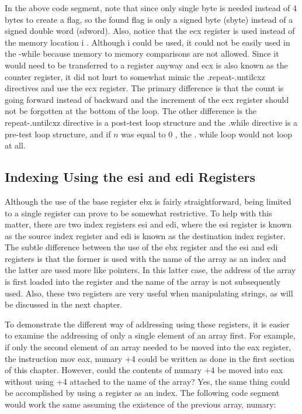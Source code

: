 \documentclass[10pt]{article}
\begin{document}
In the above code segment, note that since only single byte is needed instead of 4 bytes to create a flag, so the found flag is only a signed byte (sbyte) instead of a signed double word (sdword). Also, notice that the ecx register is used instead of the memory location i . Although i could be used, it could not be easily used in the -while because memory to memory comparisons are not allowed. Since it would need to be transferred to a register anyway and ecx is also known as the counter register, it did not hurt to somewhat mimic the .repeat-.untilcxz directives and use the ecx register. The primary difference is that the count is going forward instead of backward and the increment of the ecx register should not be forgotten at the bottom of the loop. The other difference is the repeat-.untilcxz directive is a post-test loop structure and the .while directive is a pre-test loop structure, and if $n$ was equal to 0 , the . while loop would not loop at all.

\subsection*{Indexing Using the esi and edi Registers}
Although the use of the base register ebx is fairly straightforward, being limited to a single register can prove to be somewhat restrictive. To help with this matter, there are two index registers esi and edi, where the esi register is known as the source index register and edi is known as the destination index register. The subtle difference between the use of the ebx register and the esi and edi registers is that the former is used with the name of the array as an index and the latter are used more like pointers. In this latter case, the address of the array is first loaded into the register and the name of the array is not subsequently used. Also, these two registers are very useful when manipulating strings, as will be discussed in the next chapter.

To demonstrate the different way of addressing using these registers, it is easier to examine the addressing of only a single element of an array first. For example, if only the second element of an array needed to be moved into the eax register, the instruction mov eax, numary +4 could be written as done in the first section of this chapter. However, could the contents of numary +4 be moved into eax without using +4 attached to the name of the array? Yes, the same thing could be accomplished by using a register as an index. The following code segment would work the same assuming the existence of the previous array, numary:
\end{document}
